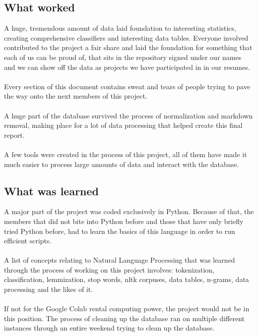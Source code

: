 \documentclass[openany]{article}
\begin{document}
\subsection{What worked}
A huge, tremendous amount of data laid foundation to interesting statistics, creating comprehensive classifiers and interesting data tables. Everyone involved contributed to the project a fair share and laid the foundation for something that each of us can be proud of, that sits in the repository signed under our names and we can show off the data as projects we have participated in in our resumes.\\ \\
Every section of this document contains sweat and tears of people trying to pave the way onto the next members of this project.\\ \\
A huge part of the database survived the process of normalization and markdown removal, making place for a lot of data processing that helped create this final report.\\ \\
A few tools were created in the process of this project, all of them have made it much easier to process large amounts of data and interact with the database.

\subsection{What was learned}
A major part of the project was coded exclusively in Python. Because of that, the members that did not bite into Python before and those that have only briefly tried Python before, had to learn the basics of this language in order to run efficient scripts.\\ \\
A list of concepts relating to Natural Language Processing that was learned through the process of working on this project involves: tokenization, classification, lemmization, stop words, nltk corpuses, data tables, n-grams, data processing and the likes of it. \\ \\
If not for the Google Colab rental computing power, the project would not be in this position. The process of cleaning up the database ran on multiple different instances through an entire weekend trying to clean up the database.
\end{document}
